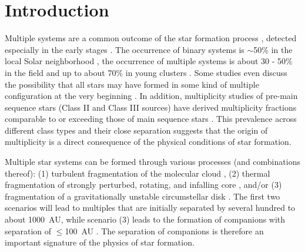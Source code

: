 \documentclass{aa}
\begin{document}

   \maketitle
%

\section{Introduction}
Multiple systems are a common outcome of the star formation process \citep{Bate18, Duchene13, Larson01}, detected especially in the early stages \citep{Tobin16, Reipurth14}. The occurrence of binary systems is $\sim$50$\%$ in the local Solar neighborhood \citep{Raghavan10_SF}, the occurrence of multiple systems is about 30 - 50$\%$ in the field \citep{Raghavan10_SF} and up to about 70$\%$ in young clusters \citep{Kraus11}. Some studies even discuss the possibility that all stars may have formed in some kind of multiple configuration at the very beginning \citep{Kroupa95, Marks14}. In addition, multiplicity studies of pre-main sequence stars (Class II and Class III sources) have derived multiplicity fractions comparable to or exceeding those of main sequence stars \citep{Moe17, Kraus11, Reipurth07}. This prevalence across different class types and their close separation suggests that the origin of multiplicity is a direct consequence of the physical conditions of star formation. \par
Multiple star systems can be formed through various processes (and combinations thereof): (1) turbulent fragmentation of the molecular cloud \citep{Kawasaki23}, (2) thermal fragmentation of strongly perturbed, rotating, and infalling core \citep[e.g.,][]{Boss14, Boss13}, and/or (3) fragmentation of a gravitationally unstable circumstellar disk \citep[e.g.,][]{Longarini23, Stamatellos09, Machida08}. The first two scenarios will lead to multiples that are initially separated by several hundred to about 1000~AU, while scenario (3) leads to the formation of companions with separation of $\leq$100~AU \citep[e.g.,][]{Tobin13, Takakuwa12, Rodriguez98}. The separation of companions is therefore an important signature of the physics of star formation. \par
\end{document}
